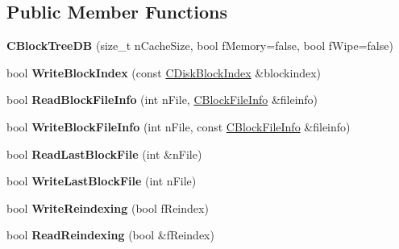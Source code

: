 \subsection*{Public Member Functions}
\begin{DoxyCompactItemize}
\item 
\mbox{\label{class_c_block_tree_d_b_a52fd1b1dc02c2a4e977099e2c2c50424}} 
{\bfseries C\+Block\+Tree\+DB} (size\+\_\+t n\+Cache\+Size, bool f\+Memory=false, bool f\+Wipe=false)
\item 
\mbox{\label{class_c_block_tree_d_b_a608a04a08445d95e477cb66889c679d0}} 
bool {\bfseries Write\+Block\+Index} (const \mbox{\hyperlink{class_c_disk_block_index}{C\+Disk\+Block\+Index}} \&blockindex)
\item 
\mbox{\label{class_c_block_tree_d_b_a6f951198dc53fbe9194626ff82638656}} 
bool {\bfseries Read\+Block\+File\+Info} (int n\+File, \mbox{\hyperlink{class_c_block_file_info}{C\+Block\+File\+Info}} \&fileinfo)
\item 
\mbox{\label{class_c_block_tree_d_b_ae248032ee1f1303dea54a0b36ad84755}} 
bool {\bfseries Write\+Block\+File\+Info} (int n\+File, const \mbox{\hyperlink{class_c_block_file_info}{C\+Block\+File\+Info}} \&fileinfo)
\item 
\mbox{\label{class_c_block_tree_d_b_adb1276fe2f0e0c4c106660948c581711}} 
bool {\bfseries Read\+Last\+Block\+File} (int \&n\+File)
\item 
\mbox{\label{class_c_block_tree_d_b_ae1f4ea54edf05a056d2da00ea90a9394}} 
bool {\bfseries Write\+Last\+Block\+File} (int n\+File)
\item 
\mbox{\label{class_c_block_tree_d_b_a8fa5d150b98f4fd1aa8cf503eddfccef}} 
bool {\bfseries Write\+Reindexing} (bool f\+Reindex)
\item 
\mbox{\label{class_c_block_tree_d_b_a1abf6fc392048428aa24a12b7942824b}} 
bool {\bfseries Read\+Reindexing} (bool \&f\+Reindex)
\item 
\mbox{\label{class_c_block_tree_d_b_a74383427266d627e84c2d0c8e21e03c7}} 

\end{DoxyCompactItemize}
